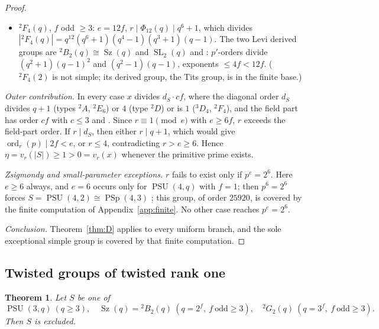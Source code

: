\documentclass[11pt]{amsart}
\newtheorem{theorem}{Theorem}[section]
\theoremstyle{definition}
\theoremstyle{remark}
\DeclareMathOperator{\PSU}{PSU}
\DeclareMathOperator{\PSp}{PSp}
\DeclareMathOperator{\SL}{SL}
\DeclareMathOperator{\Sz}{Sz}
\DeclareMathOperator{\ord}{ord}
\newcommand{\vp}[1]{v_{#1}}
\begin{document}
\begin{proof}
\begin{itemize}
$({}^2A_5(q),{}^2D_4(q),A_1(q){\times}A_2(q^2),
A_1(q^2){\times}A_2(q))$ in
\cite[Lemma~6.8, p.~82]{Montinaro2024}.
\item ${}^2F_4(q)$, $f$ odd $\geq3$: $e=12f$,
$r\mid\Phi_{12}(q)\mid q^6+1$, which divides
$|{}^2F_4(q)|=q^{12}(q^6+1)(q^4-1)(q^3+1)(q-1)$. The two Levi derived
groups are ${}^2B_2(q)\cong\Sz(q)$ and $\SL_2(q)$
\cite[Thm.~4.5(i)--(ii), p.~166]{Wilson2009} and
\cite[Main Theorem, pp.~52--53]{Malle1991}: $p'$-orders divide
$(q^2+1)(q-1)^2$ and
$(q^2-1)(q-1)$, exponents $\leq4f<12f$. (${}^2F_4(2)$ is not simple;
its derived group, the Tits group, is in the finite base.)
\end{itemize}

\emph{Outer contribution.} In every case $x$ divides $d_S\cdot c f$, where the
diagonal order $d_S$ divides $q+1$ (types ${}^2A$, ${}^2E_6$) or $4$
(type ${}^2D$) or is $1$ (${}^3D_4$, ${}^2F_4$), and the field part has
order $cf$ with $c\leq3$
\cite[Table~5, p.~xvi]{ATLAS} and
\cite[Def.~3.3 and Thm.~3.4, p.~32]{BrotoMollerOliver2019}.
Since $r\equiv1\pmod e$ with $e\geq6f$, $r$
exceeds the field-part order. If $r\mid d_S$, then either $r\mid q+1$,
which would give $\ord_r(p)\mid2f<e$, or $r\leq4$, contradicting
$r>e\geq6$. Hence
$\eta=\vp{r}(|S|)\geq1>0=\vp{r}(x)$ whenever the primitive prime exists.

\emph{Zsigmondy and small-parameter exceptions.} $r$ fails to exist only if $p^e=2^6$. Here
$e\geq6$ always, and $e=6$ occurs only for $\PSU(4,q)$ with $f=1$; then
$p^6=2^6$ forces $S=\PSU(4,2)\cong\PSp(4,3)$
\cite[Thm.~5.3, p.~61]{CameronNotes}; this group, of order $25920$, is
covered by the finite computation of Appendix~\ref{app:finite}. No other case
reaches $p^e=2^6$.

\emph{Conclusion.} Theorem~\ref{thm:D} applies to every uniform branch,
and the sole exceptional simple group is covered by that finite computation.
\end{proof}

\subsection{Twisted groups of twisted rank one}\label{app:twisted1}

\begin{theorem}\label{thm:twisted1}
Let $S$ be one of
\[
\PSU(3,q)\ (q\geq3),\quad
\Sz(q)={}^2B_2(q)\ (q=2^f,\ f\ \text{odd}\geq3),\quad
{}^2G_2(q)\ (q=3^f,\ f\ \text{odd}\geq3).
\]
Then $S$ is excluded.
\end{theorem}
\end{document}
